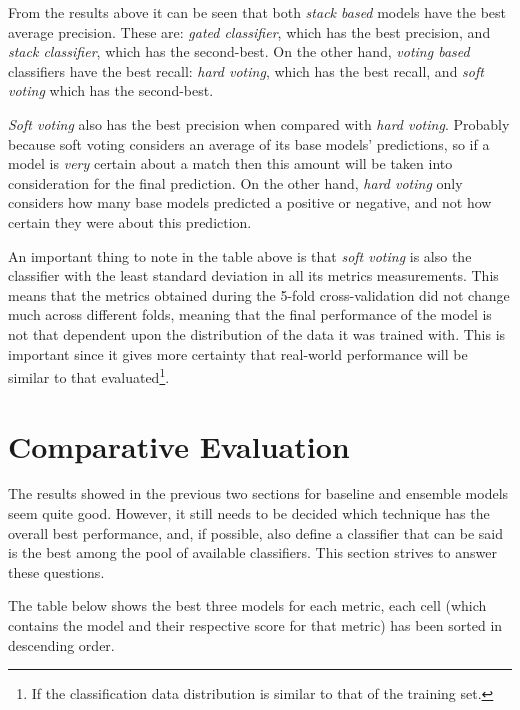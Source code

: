 \documentclass[epsfig,a4paper,11pt,titlepage,twoside,openany]{book}
\begin{document}
From the results above it can be seen that both \textit{stack based} models have the best average precision. These are: \textit{gated classifier}, which has the best precision, and \textit{stack classifier}, which has the second-best. On the other hand, \textit{voting based} classifiers have the best recall: \textit{hard voting}, which has the best recall, and \textit{soft voting} which has the second-best.

\textit{Soft voting} also has the best precision when compared with \textit{hard voting}. Probably because soft voting considers an average of its base models' predictions, so if a model is \textit{very} certain about a match then this amount will be taken into consideration for the final prediction. On the other hand, \textit{hard voting} only considers how many base models predicted a positive or negative, and not how certain they were about this prediction. 

An important thing to note in the table above is that \textit{soft voting} is also the classifier with the least standard deviation in all its metrics measurements. This means that the metrics obtained during the 5-fold cross-validation did not change much across different folds, meaning that the final performance of the model is not that dependent upon the distribution of the data it was trained with. This is important since it gives more certainty that real-world performance will be similar to that evaluated\footnote{If the classification data distribution is similar to that of the training set.}. 




\section{Comparative Evaluation}
\label{sec:comparative-evaluation}

The results showed in the previous two sections for baseline and ensemble models seem quite good. However, it still needs to be decided which technique has the overall best performance, and, if possible, also define a classifier that can be said is the best among the pool of available classifiers. This section strives to answer these questions. 

The table below shows the best three models for each metric, each cell (which contains the model and their respective score for that metric) has been sorted in descending order. 
\end{document}
